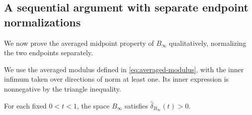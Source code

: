 \subsection{A sequential argument with separate endpoint normalizations}
\label{molc:sequential-section}

We now prove the averaged midpoint property of $B_\infty$
qualitatively, normalizing the two endpoints separately.

We use the averaged modulus defined in \eqref{eq:averaged-modulus},
with the inner infimum taken over directions of norm at least one.
Its inner expression is nonnegative by the triangle inequality.

\begin{proposition}\label{molc:sequential-positive}
For each fixed $0<t<1$, the space $B_\infty$ satisfies
$\widehat\delta_{B_\infty}(t)>0$.
\end{proposition}

